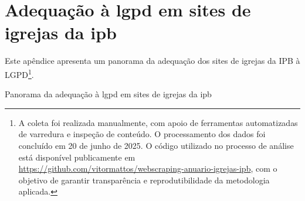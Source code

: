 \chapter{Adequação à \gls{lgpd} em sites de igrejas da \gls{ipb}}
\label{apendice:adequacao_sites}

Este apêndice apresenta um panorama da adequação dos sites de igrejas da IPB à LGPD\footnote{A coleta foi realizada manualmente, com apoio de ferramentas automatizadas de varredura e inspeção de conteúdo. O processamento dos dados foi concluído em 20 de junho de 2025. O código utilizado no processo de análise está disponível publicamente em \url{https://github.com/vitormattos/webscraping-anuario-igrejas-ipb}, com o objetivo de garantir transparência e reprodutibilidade da metodologia aplicada.}.

\begin{table}[H]
\centering
\begin{threeparttable}
\caption{Panorama da adequação à \gls{lgpd} em sites de igrejas da \gls{ipb}}

\label{tabela:panorama_adequacao_ipb}


\end{threeparttable}
\end{table}
